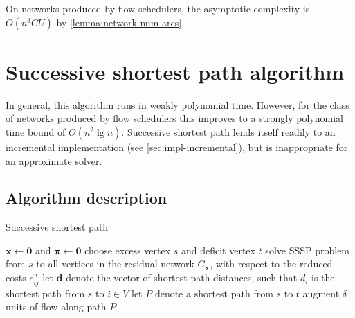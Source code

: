 \begin{remark}
On networks produced by flow schedulers, the asymptotic complexity is $O(n^3CU)$ by \cref{lemma:network-num-arcs}.
\end{remark}

\section{Successive shortest path algorithm} \label{sec:impl-ssp}


In general, this algorithm runs in weakly polynomial time. However, for the class of networks produced by flow schedulers this improves to a strongly polynomial time bound of $O(n^2 \lg n)$. Successive shortest path lends itself readily to an incremental implementation (see \cref{sec:impl-incremental}), but is inappropriate for an approximate solver.

\subsection{Algorithm description}

\begin{algorithm}
    \caption{Successive shortest path}
    \label{algo:successive-shortest-path}
    \begin{algorithmic}[1]
        \State $\mathbf{x} \gets \mathbf{0}$ and $\boldsymbol{\pi} \gets \mathbf{0}$
         \label{algo:successive-shortest-path:start-loop}
          \State choose excess vertex $s$ and deficit vertex $t$\footnotemark \label{algo:successive-shortest-path:select-active}
          \State solve SSSP problem from $s$ to all vertices in the residual network $G_{\mathbf{x}}$, with respect to the reduced costs $c^{\boldsymbol{\pi}}_{ij}$ \label{algo:successive-shortest-path:solve-sssp}
          \State let $\mathbf{d}$ denote the vector of shortest path distances, such that $d_i$ is the shortest path from $s$ to $i\in V$
           \label{algo:successive-shortest-path:update-potentials}
          \State let $P$ denote a shortest path from $s$ to $t$
           \label{algo:successive-shortest-path:compute-delta}
          \State augment $\delta$ units of flow along path $P$ \label{algo:successive-shortest-path:augment-flow}
        \EndWhile \label{algo:successive-shortest-path:end-loop}
    \end{algorithmic}
\end{algorithm}

